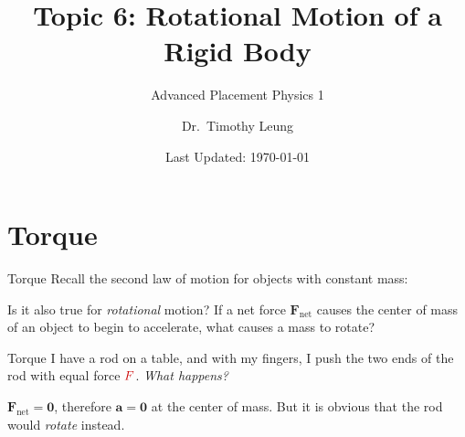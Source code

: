 \documentclass[12pt,compress,aspectratio=169]{beamer}
\title{Topic 6: Rotational Motion of a Rigid Body}
\subtitle{Advanced Placement Physics 1}
\author[TML]{Dr.\ Timothy Leung}
\institute{Olympiads School}
\date{Last Updated: \today}
\newcommand{\eq}[2]{\vspace{#1}{\Large\begin{displaymath}#2\end{displaymath}}}
\begin{document}
\begin{frame}
  \maketitle
\end{frame}





\section{Torque}

\begin{frame}{Torque}
  Recall the second law of motion for objects with constant mass:
    
  \eq{-.2in}{
    \bm{F}_\text{net}=m\bm{a}
  }

  \vspace{-.1in}Is it also true for \emph{rotational} motion? If a net force
  $\bm{F}_\text{net}$ causes the center of mass of an object to begin to
  accelerate, what causes a mass to rotate?
\end{frame}



\begin{frame}{Torque}
  I have a rod on a table, and with my fingers, I push the two ends of the rod
  with equal force $\textcolor{red!80!black}{F}$. \emph{What happens?}
  \begin{center}
  \end{center}
  $\bm{F}_\text{net}=\bm{0}$, therefore $\bm{a}=\bm{0}$ at the center of mass.
  But it is obvious that the rod would \emph{rotate} instead.
\end{frame}
\end{document}
